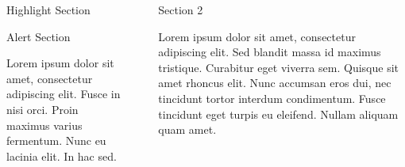 \documentclass[final]{beamer}
\newlength{\sepwid}
\newlength{\onecolwid}
\begin{document}
\begin{frame}[t]
\begin{columns}[t]
\begin{column}{\onecolwid}
\begin{alertblock}{Highlight Section}
\end{alertblock}

\vspace*{0.4in}


\begin{alertblock}{Alert Section}

Lorem ipsum dolor sit amet, consectetur adipiscing elit. Fusce in nisi orci. Proin maximus varius fermentum. Nunc eu lacinia elit. In hac sed.


\end{alertblock}



\end{column} %

\begin{column}{\sepwid}\end{column} %

\begin{column}{\onecolwid} %



\begin{block}{Section 2}

Lorem ipsum dolor sit amet, consectetur adipiscing elit. Sed blandit massa id maximus tristique. Curabitur eget viverra sem. Quisque sit amet rhoncus elit. Nunc accumsan eros dui, nec tincidunt tortor interdum condimentum. Fusce tincidunt eget turpis eu eleifend. Nullam aliquam quam amet.


\end{block}
\end{column}
\end{columns}
\end{frame}
\end{document}
